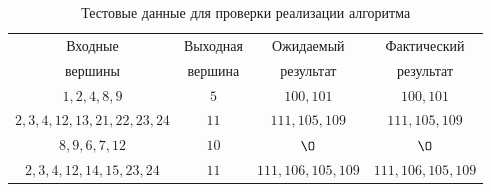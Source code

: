 \begin{table}[h!]
    \centering
    \caption{Тестовые данные для проверки реализации алгоритма}
    \begin{tabular}{|c|c|c|c|}
        \hline
        Входные & Выходная & Ожидаемый & Фактический \\
        вершины & вершина & результат & результат \\
        \hline
        \hline
        $1,2,4,8,9$ & $5$ & $100,101$ & $100,101$ \\
		$2,3,4,12,13,21,22,23,24$ & $11$ & $111,105,109$ & $111,105,109$ \\
		$8,9,6,7,12$ & $10$ & $\O$ & $\O$ \\
		$2,3,4,12,14,15,23,24$ & $11$ & $111,106,105,109$ & $111,106,105,109$ \\
        \hline
    \end{tabular}
\end{table}
